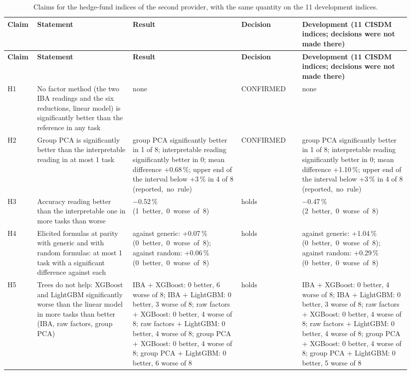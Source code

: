 {\scriptsize\setlength{\tabcolsep}{4pt}\renewcommand{\arraystretch}{1.2}
\begin{longtable}{@{}>{\raggedright\arraybackslash}p{0.069\linewidth}>{\raggedright\arraybackslash}p{0.226\linewidth}>{\raggedright\arraybackslash}p{0.254\linewidth}>{\raggedright\arraybackslash}p{0.141\linewidth}>{\raggedright\arraybackslash}p{0.254\linewidth}@{}}
\caption{Claims for the hedge-fund indices of the second provider, with the same quantity on the 11 development indices.}\label{tab:C2}\\
\toprule
\textbf{Claim} & \textbf{Statement} & \textbf{Result} & \textbf{Decision} & \textbf{Development (11 CISDM indices; decisions were not made there)} \\
\midrule
\endfirsthead
\toprule
\textbf{Claim} & \textbf{Statement} & \textbf{Result} & \textbf{Decision} & \textbf{Development (11 CISDM indices; decisions were not made there)} \\
\midrule
\endhead
\bottomrule
\endlastfoot
H1 & No factor method (the two IBA readings and the six reductions, linear model) is significantly better than the reference in any task & none & CONFIRMED & none \\
H2 & Group PCA is significantly better than the interpretable reading in at most 1 task & group PCA significantly better in 1 of 8; interpretable reading significantly better in 0; mean difference +0.68\,\%; upper end of the interval below +3\,\% in 4 of 8 (reported,~no~rule) & CONFIRMED & group PCA significantly better in 1 of 8; interpretable reading significantly better in 0; mean difference +1.10\,\%; upper end of the interval below +3\,\% in 4 of 8 (reported,~no~rule) \\
H3 & Accuracy reading better than the interpretable one in more tasks than worse & \ensuremath{-}0.52\,\% (1~better,~0~worse~of~8) & holds & \ensuremath{-}0.47\,\% (2~better,~0~worse~of~8) \\
H4 & Elicited formulas at parity with generic and with random formulas: at most 1 task with a significant difference against each & against generic: +0.07\,\% (0~better,~0~worse~of~8); against random: +0.06\,\% (0~better,~0~worse~of~8) & holds & against generic: +1.04\,\% (0~better,~0~worse~of~8); against random: +0.29\,\% (0~better,~0~worse~of~8) \\
H5 & Trees do not help: XGBoost and LightGBM significantly worse than the linear model in more tasks than better (IBA, raw factors, group PCA) & IBA + XGBoost: 0 better, 6 worse of 8; IBA + LightGBM: 0 better, 3 worse of 8; raw factors + XGBoost: 0 better, 4 worse of 8; raw factors + LightGBM: 0 better, 4 worse of 8; group PCA + XGBoost: 0 better, 4 worse of 8; group PCA + LightGBM: 0 better, 6 worse of 8 & holds & IBA + XGBoost: 0 better, 4 worse of 8; IBA + LightGBM: 0 better, 3 worse of 8; raw factors + XGBoost: 0 better, 4 worse of 8; raw factors + LightGBM: 0 better, 4 worse of 8; group PCA + XGBoost: 0 better, 4 worse of 8; group PCA + LightGBM: 0 better, 5 worse of 8 \\

\end{longtable}}
